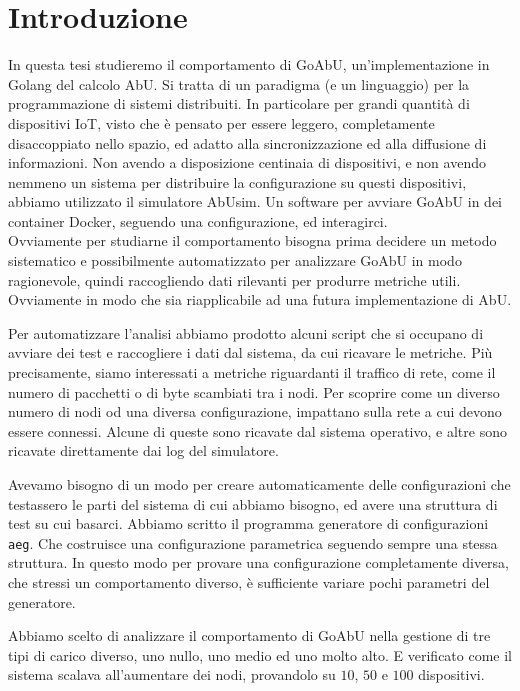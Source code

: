 \documentclass[12pt, a4paper]{article}
\newcommand{\aeg}[0]{{\lstinline{aeg}}}
\begin{document}
\newpage
\tableofcontents

\newpage

\section{Introduzione}

In questa tesi studieremo il comportamento di GoAbU, un'implementazione in Golang del calcolo AbU. Si tratta di un paradigma (e un linguaggio) per la programmazione di sistemi distribuiti.
In particolare per grandi quantità di dispositivi IoT, visto che è pensato per essere leggero, completamente disaccoppiato nello spazio, ed adatto alla sincronizzazione ed alla diffusione di informazioni.
Non avendo a disposizione centinaia di dispositivi, e non avendo nemmeno un sistema per distribuire la configurazione su questi dispositivi, abbiamo utilizzato il simulatore AbUsim. Un software per avviare GoAbU in dei container Docker, seguendo una configurazione, ed interagirci.\\
Ovviamente per studiarne il comportamento bisogna prima decidere un metodo sistematico e possibilmente automatizzato per analizzare GoAbU in modo ragionevole, quindi raccogliendo dati rilevanti per produrre metriche utili. Ovviamente in modo che sia riapplicabile ad una futura implementazione di AbU.

Per automatizzare l'analisi abbiamo prodotto alcuni script che si occupano di avviare dei test e raccogliere i dati dal sistema, da cui ricavare le metriche.
Più precisamente, siamo interessati a metriche riguardanti il traffico di rete, come il numero di pacchetti o di byte scambiati tra i nodi.
Per scoprire come un diverso numero di nodi od una diversa configurazione, impattano sulla rete a cui devono essere connessi. Alcune di queste sono ricavate dal sistema operativo, e altre sono ricavate direttamente dai log del simulatore.

Avevamo bisogno di un modo per creare automaticamente delle configurazioni che testassero le parti del sistema di cui abbiamo bisogno, ed avere una struttura di test su cui basarci. Abbiamo scritto il programma generatore di configurazioni \aeg. Che costruisce una configurazione parametrica seguendo sempre una stessa struttura.
In questo modo per provare una configurazione completamente diversa, che stressi un comportamento diverso, è sufficiente variare pochi parametri del generatore.

Abbiamo scelto di analizzare il comportamento di GoAbU nella gestione di tre tipi di carico diverso, uno nullo, uno medio ed uno molto alto. E verificato come il sistema scalava all'aumentare dei nodi, provandolo su $10$, $50$ e $100$ dispositivi.
\end{document}

